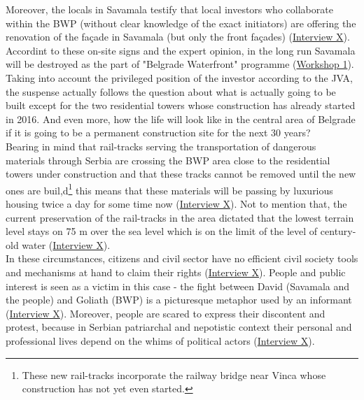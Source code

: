 \documentclass[11pt]{report}
\begin{document}
{Moreover, the locals in Savamala testify that local investors who collaborate within the BWP (without clear knowledge of the exact initiators) are offering the renovation of the façade in Savamala (but only the front façades)
(\href{InterviewX}{Interview X}).
Accordint to these on-site signs and the expert opinion, in the long run Savamala will be destroyed as the part of "Belgrade Waterfront" programme
(\href{Expert Workshop}{Workshop 1}).
\\

Taking into account the privileged position of the investor according to the JVA, the suspense actually follows the question about what is actually going to be built except for the two residential towers whose construction has already started in 2016.
And even more, how the life will look like in the central area of Belgrade if it is going to be a permanent construction site for the next 30 years?
\\

Bearing in mind that rail-tracks serving the transportation of dangerous materials through Serbia are crossing the BWP area close to the residential towers under construction and that these tracks cannot be removed until the new ones are buil,d\footnote{These new rail-tracks incorporate the railway bridge near Vinca whose construction has not yet even started.}
this means that these materials will be passing by luxurious housing twice a day for some time now
(\href{InterviewX}{Interview X}).
Not to mention that, the current preservation of the rail-tracks in the area dictated that the lowest terrain level stays on 75 m over the sea level which is on the limit of the level of century-old water (\href{InterviewX}{Interview X}).
\\

In these circumstances, citizens and civil sector have no efficient civil society tools and mechanisms at hand to claim their rights (\href{InterviewX}{Interview X}).
People and public interest is seen as a victim in this case - the fight between David (Savamala and the people) and Goliath (BWP) is a picturesque metaphor used by an informant
(\href{InterviewX}{Interview X}).
Moreover, people are scared to express their discontent and protest, because in Serbian patriarchal and nepotistic context their personal and professional lives depend on the whims of political actors (\href{InterviewX}{Interview X}).
\\

}
\end{document}
